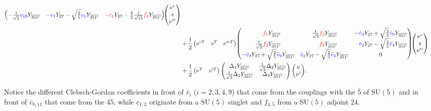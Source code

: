 \documentclass[a4paper,12pt]{article}
\def\yd{Y_{27}}
\def\yt{Y_{\overline{351'}}}
\def\SU{\mathrm{SU}}
\def\RED{\textcolor{red}}
\def\BLUE{\textcolor{blue}}
\begin{document}
\begin{align}
\begin{pmatrix}
 -\tfrac{1}{\sqrt{2}} \BLUE{v_{10}} \yt & -\BLUE{v_1} \yd-\sqrt{\frac{2}{5}} \BLUE{v_5} \yt  & -\RED{c_1} \yd-\tfrac{3}{2}\frac{1}{\sqrt{15}} \RED{f_4} \yt \\
\end{pmatrix} \!\!
\begin{pmatrix}
\nu^c \\
s \\
\nu'^c
\end{pmatrix} \nonumber\\
&+\frac{1}{2}
\begin{pmatrix}
\nu^{cT} & s^T & \nu'^{cT}\\
\end{pmatrix}\!
\begin{pmatrix}
 \phantom{\tfrac{1}{\sqrt{2}}}\RED{f_1} \yt  & \tfrac{1}{\sqrt{2}}\RED{f_2} \yt &-\BLUE{\bar{v}_3} \yd+ \sqrt{\frac{2}{5}} \BLUE{\bar{v}_9} \yt \\
 \tfrac{1}{\sqrt{2}}\RED{f_2} \yt & \phantom{\tfrac{1}{\sqrt{2}}}\RED{f_3} \yt  &\phantom{-}\BLUE{\bar{v}_2} \yd-\sqrt{\frac{2}{5}} \BLUE{\bar{v}_4} \yt  \\
 -\BLUE{\bar{v}_3} \yd+\sqrt{\frac{2}{5}} \BLUE{\bar{v}_9} \yt & \BLUE{\bar{v}_2} \yd-\sqrt{\frac{2}{5}} \BLUE{\bar{v}_4} \yt  & 0\\
\end{pmatrix}\!\!
\begin{pmatrix}
\nu^c \\
s \\
\nu'^c\\
\end{pmatrix}\nonumber\\
&+\frac{1}{2}
\begin{pmatrix}
\nu^T & \nu'^T
\end{pmatrix}
\begin{pmatrix}
\Delta_1 Y_{\overline{351'}} & \tfrac{1}{\sqrt{2}}\Delta_2 Y_{\overline{351'}}\\
\tfrac{1}{\sqrt{2}}\Delta_2 Y_{\overline{351'}}& \Delta_3 Y_{\overline{351'}}\\
\end{pmatrix}
\begin{pmatrix}
\nu \\
\nu' \\
\end{pmatrix}\!.\label{equation:Yukawa-terms-full}
\end{align}

Notice the different Clebsch-Gordan coefficients in front of $\bar v_i$ ($i=2,3,4,9$) that come from the couplings with the
$\bar 5$ of $\SU(5)$ and in front of $\bar v_{8,11}$ that come from the $\overline{45}$, while $c_{1,2}$ originate from a $\SU(5)$
singlet and $f_{4,5}$ from a $\SU(5)$ adjoint $24$.
\end{document}

